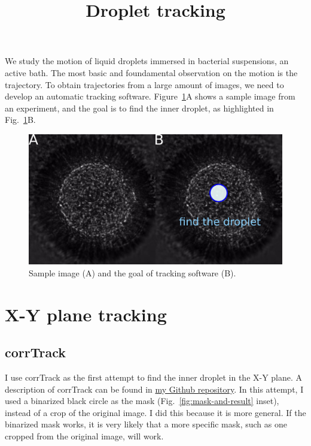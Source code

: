 \documentclass[onecolumn,aps, pre,amsmath,amssymb,longbibliography,12pt]{revtex4-2}
\begin{document}
\title{Droplet tracking}
\maketitle

We study the motion of liquid droplets immersed in bacterial suspensions, an active bath.
The most basic and foundamental observation on the motion is the trajectory.
To obtain trajectories from a large amount of images, we need to develop an automatic tracking software.
Figure~\ref{fig:sample-image}A shows a sample image from an experiment, and the goal is to find the inner droplet, as highlighted in Fig.~\ref{fig:sample-image}B.

\begin{figure}[h]
  \includegraphics{sample-image.png}
  \caption{Sample image (A) and the goal of tracking software (B).}
  \label{fig:sample-image}
\end{figure}

\section{X-Y plane tracking}

\subsection{corrTrack}

I use corrTrack as the first attempt to find the inner droplet in the X-Y plane.
A description of corrTrack can be found in \href{https://github.com/ZLoverty/Python/tree/master/Tracking/corrTrack}{my Github repository}.
In this attempt, I used a binarized black circle as the mask (Fig.~\ref{fig:mask-and-result} inset), instead of a crop of the original image.
I did this because it is more general.
If the binarized mask works, it is very likely that a more specific mask, such as one cropped from the original image, will work.
\end{document}
